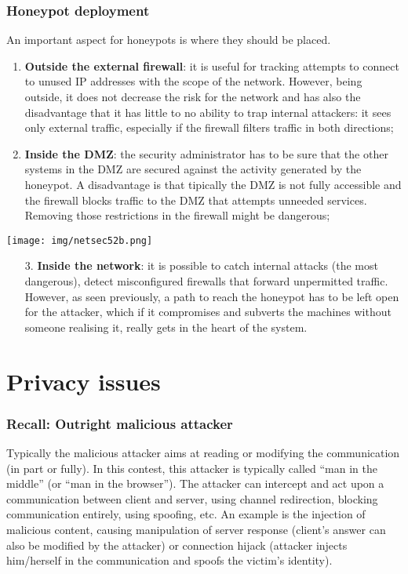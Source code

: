 \documentclass[a4paper, 10pt, titlepage]{article}
\begin{document}
\subsubsection*{Honeypot deployment}
An important aspect for honeypots is where they should be placed.\\
\begin{minipage}{0.45\textwidth}
	\begin{enumerate}
		\item \textbf{Outside the external firewall}: it is useful for tracking attempts to connect to unused IP addresses with the scope of the network. However, being outside, it does not decrease the risk for the network and has also the disadvantage that it has little to no ability to trap internal attackers: it sees only external traffic, especially if the firewall filters traffic in both directions;
		\item \textbf{Inside the DMZ}: the security administrator has to be sure that the other systems in the DMZ are secured against the activity generated by the honeypot. A disadvantage is that tipically the DMZ is not fully accessible and the firewall blocks traffic to the DMZ that attempts unneeded services. Removing those restrictions in the firewall might be dangerous;
 	\end{enumerate}
\end{minipage}\hfill
\begin{minipage}{0.52\textwidth}
	\begin{center}
		\texttt{[image: img/netsec52b.png]}
	\end{center}
\end{minipage}
\begin{enumerate}
	\item[3.] \textbf{Inside the network}: it is possible to catch internal attacks (the most dangerous), detect misconfigured firewalls that forward unpermitted traffic. However, as seen previously, a path to reach the honeypot has to be left open for the attacker, which if it compromises and subverts the machines without someone realising it, really gets in the heart of the system.
\end{enumerate}

\newpage
\section{Privacy issues}
\subsubsection*{Recall: Outright malicious attacker}
Typically the malicious attacker aims at reading or modifying the communication (in part or fully). In this contest, this attacker is typically called “man in the middle” (or “man in the browser”). The attacker can intercept and act upon a communication between client and server, using channel redirection, blocking communication entirely, using spoofing, etc. An example is the injection of malicious content, causing manipulation of server response (client’s answer can also be modified by the attacker) or connection hijack (attacker injects him/herself in the communication and spoofs the victim’s identity).
\end{document}

